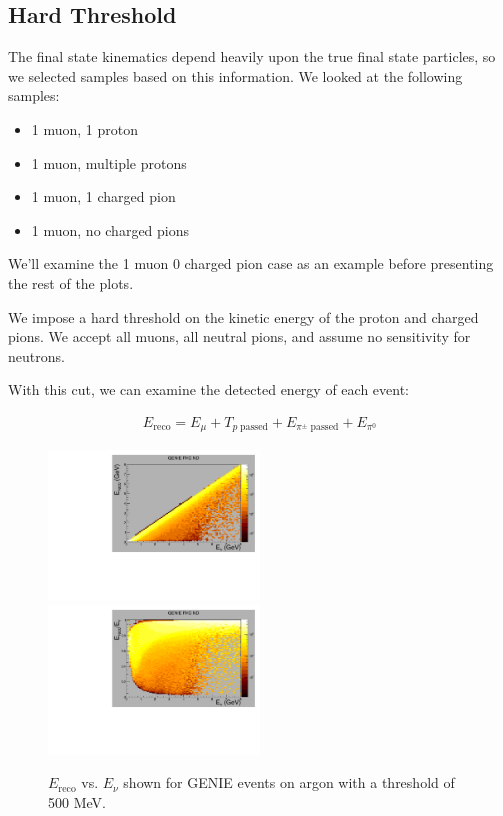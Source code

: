 \documentclass{article}
\begin{document}
\subsection{Hard Threshold}

The final state kinematics depend heavily upon the true final state particles, so we selected samples based on this information.  We looked at the following samples:

\begin{itemize}
\item 1 muon, 1 proton
\item 1 muon, multiple protons
\item 1 muon, 1 charged pion
\item 1 muon, no charged pions
\end{itemize}

We'll examine the 1 muon 0 charged pion case as an example before presenting the rest of the plots.

We impose a hard threshold on the kinetic energy of the proton and charged pions.  We accept all muons, all neutral pions, and assume no sensitivity for neutrons.

With this cut, we can examine the detected energy of each event:

\begin{align}
  E_{\mathrm{reco}} = E_{\mu} + T_{p \; \mathrm{passed}} + E_{\pi^{\pm} \; \mathrm{passed}} + E_{\pi^0}
\end{align}

\begin{figure}[!h]
  \includegraphics[width=0.5\textwidth]{plots.old/fig7.pdf}
  \includegraphics[width=0.5\textwidth]{plots.old/fig8.pdf}
  \caption{$E_{\mathrm{reco}}$ vs. $E_\nu$ shown for GENIE events on argon with a threshold of 500 MeV.}
\end{figure}
\end{document}
